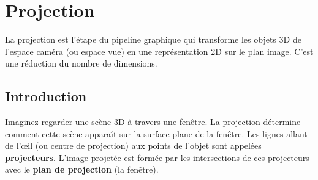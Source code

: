 \section{Projection}
La projection est l'étape du pipeline graphique qui transforme les objets 3D de l'espace caméra (ou espace vue) en une représentation 2D sur le plan image. C'est une réduction du nombre de dimensions.
\subsection{Introduction}
Imaginez regarder une scène 3D à travers une fenêtre. La projection détermine comment cette scène apparaît sur la surface plane de la fenêtre. Les lignes allant de l'œil (ou centre de projection) aux points de l'objet sont appelées \textbf{projecteurs}. L'image projetée est formée par les intersections de ces projecteurs avec le \textbf{plan de projection} (la fenêtre).

